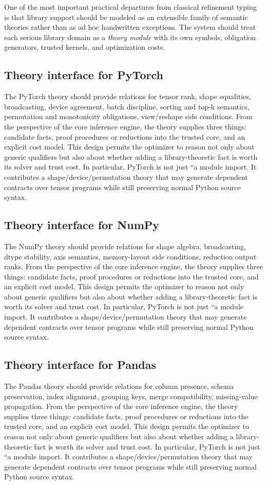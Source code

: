 \documentclass[11pt]{article}
\theoremstyle{definition}
\theoremstyle{plain}
\begin{document}
One of the most important practical departures from classical refinement typing
is that library support should be modeled as an extensible family of semantic
theories rather than as ad hoc handwritten exceptions. The system should treat
each serious library domain as a \emph{theory module} with its own symbols,
obligation generators, trusted kernels, and optimization costs.
\subsection{Theory interface for PyTorch}
The PyTorch theory should provide relations for tensor rank, shape equalities, broadcasting, device agreement, batch discipline, sorting and top-k semantics, permutation and monotonicity obligations, view/reshape side conditions. From the perspective of
the core inference engine, the theory supplies three things: candidate facts,
proof procedures or reductions into the trusted core, and an explicit cost model.
This design permits the optimizer to reason not only about generic qualifiers but
also about whether adding a library-theoretic fact is worth its solver and trust
cost. In particular, PyTorch is not just ``a module import. It contributes a
shape/device/permutation theory that may generate dependent contracts over tensor
programs while still preserving normal Python source syntax.

\subsection{Theory interface for NumPy}
The NumPy theory should provide relations for shape algebra, broadcasting, dtype stability, axis semantics, memory-layout side conditions, reduction output ranks. From the perspective of
the core inference engine, the theory supplies three things: candidate facts,
proof procedures or reductions into the trusted core, and an explicit cost model.
This design permits the optimizer to reason not only about generic qualifiers but
also about whether adding a library-theoretic fact is worth its solver and trust
cost. In particular, PyTorch is not just ``a module import. It contributes a
shape/device/permutation theory that may generate dependent contracts over tensor
programs while still preserving normal Python source syntax.

\subsection{Theory interface for Pandas}
The Pandas theory should provide relations for column presence, schema preservation, index alignment, grouping keys, merge compatibility, missing-value propagation. From the perspective of
the core inference engine, the theory supplies three things: candidate facts,
proof procedures or reductions into the trusted core, and an explicit cost model.
This design permits the optimizer to reason not only about generic qualifiers but
also about whether adding a library-theoretic fact is worth its solver and trust
cost. In particular, PyTorch is not just ``a module import. It contributes a
shape/device/permutation theory that may generate dependent contracts over tensor
programs while still preserving normal Python source syntax.
\end{document}
